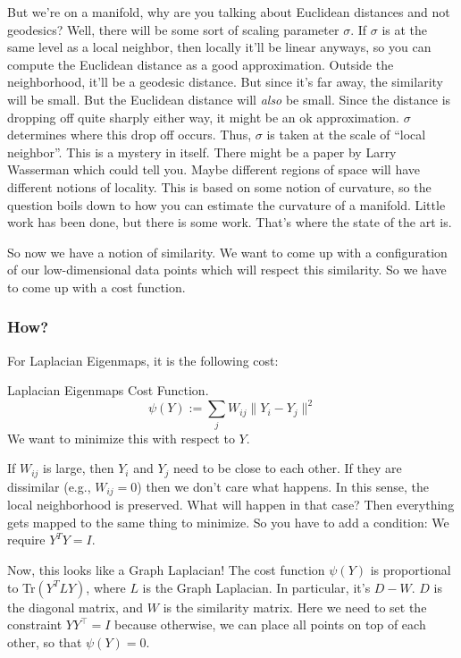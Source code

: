 But we're on a manifold, why are you talking about Euclidean distances and not geodesics? Well, there will be some sort of scaling parameter $\sigma$. If $\sigma$ is at the same level as a local neighbor, then locally it'll be linear anyways, so you can compute the Euclidean distance as a good approximation. Outside the neighborhood, it'll be a geodesic distance. But since it's far away, the similarity will be small. But the Euclidean distance will \textit{also} be small. Since the distance is dropping off quite sharply either way, it might be an ok approximation. $\sigma$ determines where this drop off occurs. Thus, $\sigma$ is taken at the scale of ``local neighbor''. This is a mystery in itself. There might be a paper by Larry Wasserman which could tell you. Maybe different regions of space will have different notions of locality. This is based on some notion of curvature, so the question boils down to how you can estimate the curvature of a manifold. Little work has been done, but there is some work. That's where the state of the art is. 

So now we have a notion of similarity. We want to come up with a configuration of our low-dimensional data points which will respect this similarity. So we have to come up with a cost function.\\

\subsubsection*{How?}
For Laplacian Eigenmaps, it is the following cost: 
\begin{definition} Laplacian Eigenmaps Cost Function. \\
\[
\psi(Y) := \sum_j W_{ij}\|Y_i - Y_j\|^2
\]
We want to minimize this with respect to $Y$. 
\end{definition}

If $W_{ij}$ is large, then $Y_i$ and $Y_j$ need to be close to each other. If they are dissimilar (e.g., $W_{ij} = 0$) then we don't care what happens. In this sense, the local neighborhood is preserved. What will happen in that case? Then everything gets mapped to the same thing to minimize. So you have to add a condition: We require $Y^TY = I$. 

Now, this looks like a Graph Laplacian! The cost function $\psi(Y)$ is proportional to Tr$(Y^TLY)$, where $L$ is the Graph Laplacian. In particular, it's $D - W$. $D$ is the diagonal matrix, and $W$ is the similarity matrix. Here we need to set the constraint $YY^{\top}=I$ because otherwise, we can place all points on top of each other, so that $\psi(Y)=0$.
 

